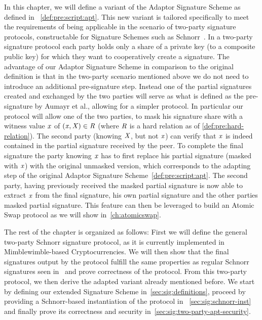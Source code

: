 In this chapter, we will define a variant of the Adaptor Signature Scheme as defined in ~\cref{def:pre:script:apt}.
This new variant is tailored specifically to meet the requirements of being applicable in the scenario of two-party signature protocols, constructable for Signature Schemes such as Schnorr~\cite{maxwell2019simple}.
In a two-party signature protocol each party holds only a share of a private key (to a composite public key) for which they want to cooperatively create a signature.
The advantage of our Adaptor Signature Scheme in comparison to the original definition is that in the two-party scenario mentioned above we do not need to introduce an additional pre-signature step.
Instead one of the partial signatures created and exchanged by the two parties will serve as what is defined as the pre-signature by Aumayr et al., allowing for a simpler protocol.
In particular our protocol will allow one of the two parties, to mask his signature share with a witness value $\mathit{x}$ of $(\mathit{x}, \mathit{X}) \in \mathit{R}$ (where $\mathit{R}$ is a hard relation as of \cref{def:pre:hard-relation}).
The second party (knowing $\mathit{X}$, but not $\mathit{x}$) can verify that $\mathit{x}$ is indeed contained in the partial signature received by the peer.
To complete the final signature the party knowing $\mathit{x}$ has to first replace his partial signature (masked with $\mathit{x}$) with the original unmasked version, which corresponds to the adapting step of the original Adaptor Signature Scheme~\cref{def:pre:script:apt}.
The second party, having previously received the masked partial signature is now able to extract $\mathit{x}$ from the final signature, his own partial signature and the other parties masked partial signature.
This feature can then be leveraged to build an Atomic Swap protocol as we will show in~\cref{ch:atomicswap}.

The rest of the chapter is organized as follows:
First we will define the general two-party Schnorr signature protocol, as it is currently implemented in Mimblewimble-based Cryptocurrencies.
We will then show that the final signatures output by the protocol fulfill the same properties as regular Schnorr signatures seen in~\cite{schnorr1989efficient} and prove correctness of the protocol.
From this two-party protocol, we then derive the adapted variant already mentioned before.
We start by defining our extended Signature Scheme in~\cref{sec:sig:definitions}, proceed by providing a Schnorr-based instantiation of the protocol in ~\cref{sec:sig:schnorr-inst} and finally prove its correctness and security in~\cref{sec:sig:two-party-apt-security}.

